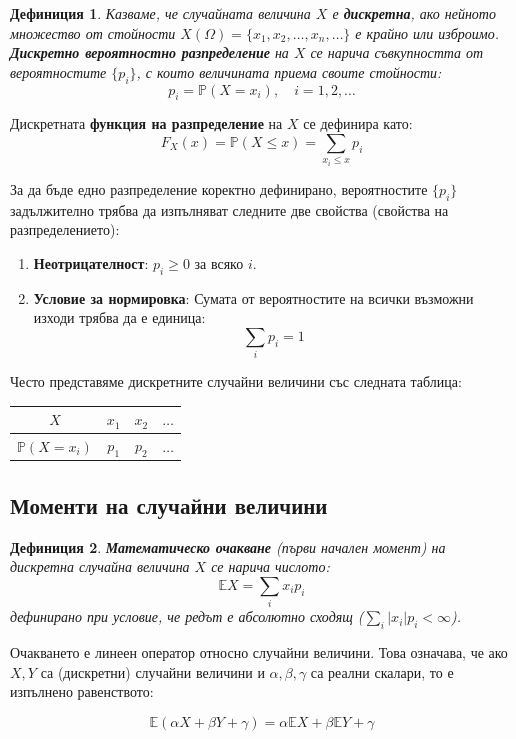 \documentclass{scrartcl}
\newtheorem{definition}{Дефиниция}
\begin{document}
\begin{FlushLeft}
\begin{definition}
Казваме, че случайната величина $X$ е \textbf{дискретна}, ако нейното множество от стойности $X(\Omega) = \{x_1, x_2, \dots, x_n, \dots\}$ е крайно или изброимо. \textbf{Дискретно вероятностно разпределение} на $X$ се нарича съвкупността от вероятностите $\{p_i\}$, с които величината приема своите стойности:
\[ p_i = \mathbb{P}(X = x_i), \quad i = 1, 2, \dots \]
\end{definition}

Дискретната \textbf{функция на разпределение} на $X$ се дефинира като:
\[ F_X(x) = \mathbb{P}(X \le x) = \sum_{x_i \le x} p_i \]

За да бъде едно разпределение коректно дефинирано, вероятностите $\{p_i\}$ задължително трябва да изпълняват следните две свойства (свойства на разпределението):
\begin{enumerate}
    \item \textbf{Неотрицателност}: $p_i \ge 0$ за всяко $i$.
    \item \textbf{Условие за нормировка}: Сумата от вероятностите на всички възможни изходи трябва да е единица:
    \[ \sum_{i} p_i = 1 \]
\end{enumerate}

Често представяме дискретните случайни величини със следната таблица:

\begin{tabular}{|c|c|c|c|}
  \hline
  $X$ & $x_1$ & $x_2$ & $\dots$ \\ \hline
  $\mathbb{P}(X = x_i)$ & $p_1$ & $p_2$ & $\dots$ \\ \hline
\end{tabular}

\subsection{Моменти на случайни величини}
\begin{definition}
\textbf{Математическо очакване} (първи начален момент) на дискретна случайна величина $X$ се нарича числото:
\[ \mathbb{E}X = \sum_{i} x_i p_i \]
дефинирано при условие, че редът е абсолютно сходящ ($\sum_{i} |x_i| p_i < \infty$).
\end{definition}

Очакването е линеен оператор относно случайни величини. Това означава, че ако $X, Y$ са (дискретни) случайни величини и $\alpha, \beta, \gamma$ са реални скалари, то е изпълнено равенството:

$$\mathbb{E}(\alpha X + \beta Y + \gamma) = \alpha\mathbb{E}X + \beta\mathbb{E}Y + \gamma$$


\end{FlushLeft}
\end{document}
